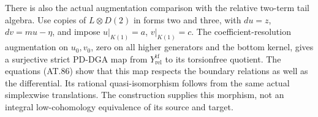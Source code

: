 There is also the actual augmentation comparison
with the relative two-term tail algebra.
Use copies of $L\otimes D(2)$ in forms two and
three, with $du=z$, $dv=mu-\eta$, and impose
$u|_{K(1)}=a$, $v|_{K(1)}=c$.
The coefficient-resolution augmentation on $u_0,v_0$,
zero on all higher generators and the bottom kernel,
gives a surjective strict PD-DGA map from
$Y_{\mathrm{rel}}^{\mathrm{tf}}$ to its torsionfree
quotient. The equations \textup{(AT.86)} show that
this map respects the boundary relations as well
as the differential.
Its rational quasi-isomorphism follows from the
same actual simplexwise translations.
The construction supplies this morphism, not an
integral low-cohomology equivalence of its source
and target.

